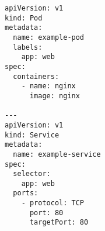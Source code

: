 \begin{verbatim}
apiVersion: v1
kind: Pod
metadata:
  name: example-pod
  labels:
    app: web
spec:
  containers:
    - name: nginx
      image: nginx

---
apiVersion: v1
kind: Service
metadata:
  name: example-service
spec:
  selector:
    app: web
  ports:
    - protocol: TCP
      port: 80
      targetPort: 80

\end{verbatim}